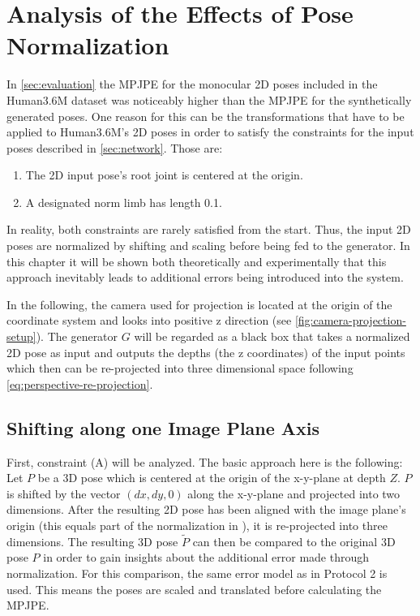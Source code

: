 \section{Analysis of the Effects of Pose Normalization}
\label{sec:effects-of-normalization}

In \autoref{sec:evaluation} the MPJPE for the monocular 2D poses included in the Human3.6M dataset was noticeably higher than the MPJPE for the synthetically generated poses.
One reason for this can be the transformations that have to be applied to Human3.6M's 2D poses in order to satisfy the constraints for the input poses described in \autoref{sec:network}.
Those are:
\begin{enumerate}[label=(\Alph*)]
	\item The 2D input pose's root joint is centered at the origin.
	\item A designated norm limb has length 0.1.
\end{enumerate}

In reality, both constraints are rarely satisfied from the start.
Thus, the input 2D poses are normalized by shifting and scaling before being fed to the generator.
In this chapter it will be shown both theoretically and experimentally that this approach inevitably leads to additional errors being introduced into the system.

In the following, the camera used for projection is located at the origin of the coordinate system and looks into positive z direction (see \autoref{fig:camera-projection-setup}).
The generator $G$ will be regarded as a black box that takes a normalized 2D pose as input and outputs the depths (the z coordinates) of the input points which then can be re-projected into three dimensional space following \autoref{eq:perspective-re-projection}.

\subsection{Shifting along one Image Plane Axis}
\label{sec:x-shift-error}
First, constraint (A) will be analyzed.
The basic approach here is the following:
Let $P$ be a 3D pose which is centered at the origin of the x-y-plane at depth $Z$.
$P$ is shifted by the vector $(dx, dy, 0)$ along the x-y-plane and projected into two dimensions.
After the resulting 2D pose has been aligned with the image plane's origin (this equals part of the normalization in \cite{drover18}), it is re-projected into three dimensions.
The resulting 3D pose $\widetilde{P}$ can then be compared to the original 3D pose $P$ in order to gain insights about the additional error made through normalization.
For this comparison, the same error model as in Protocol 2 is used.
This means the poses are scaled and translated before calculating the MPJPE.

